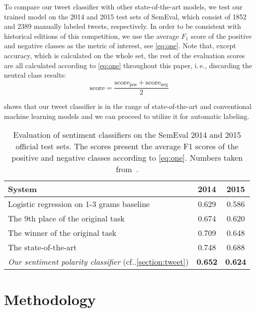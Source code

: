 \documentclass[conference]{IEEEtran}
\makeatletter
\DeclareRobustCommand\onedot{\futurelet\@let@token\@onedot}
\def\@onedot{\ifx\@let@token.\else.\null\fi\xspace}
\newcommand{\cf}{cf\onedot}
\newcommand{\ie}{i.\,e.,\xspace}
\makeatother
\begin{document}
To compare our tweet classifier with other state-of-the-art models, we test our trained model on the 2014 and 2015 test sets of SemEval, which consist of \num{1852} and \num{2389} manually labeled tweets, respectively. In order to be consistent with historical editions of this competition, we use the average $F_1$ score of the positive and negative classes as the metric of interest, see \cref{eq:one}. Note that, except accuracy, which is calculated on the whole set, the rest of the evaluation scores are all calculated according to \cref{eq:one} throughout this paper, \ie discarding the neutral class results:
\begin{equation}
 \text{score} =  \frac{\text{score}_\text{pos} + \text{score}_\text{neg}}{2}
\label{eq:one}
\end{equation}



 shows that our tweet classifier is in the range of state-of-the-art and conventional machine learning models and we can proceed to utilize it for automatic labeling. 

\begin{table}[t]
\centering
\caption{Evaluation of sentiment classifiers on the SemEval 2014 and 2015 official test sets.
The scores present the average F1 scores of the positive and negative classes according to \cref{eq:one}. 
Numbers taken from~\protect\cite{cliche-2017-bb,rosenthal2019semeval2014,rosenthal2019semeval2015}.}
\label{tab:semval_results}
\begin{tabular}{lcc} 
\toprule
\textbf{System} & \textbf{2014} & \textbf{2015} \\
\midrule
Logistic regression on 1-3 grams baseline & 0.629 & 0.586 \\
The 9th place of the original task & 0.674 & 0.620 \\
The winner of the original task & 0.709 & 0.648 \\
The state-of-the-art & 0.748 & 0.688 \\
\emph{Our sentiment polarity classifier} (\cf\cref{section:tweet}) & \textbf{0.652} & \textbf{0.624} \\
\bottomrule
\end{tabular}
\end{table}



\section{Methodology}
\label{section:Methodology}
\end{document}
